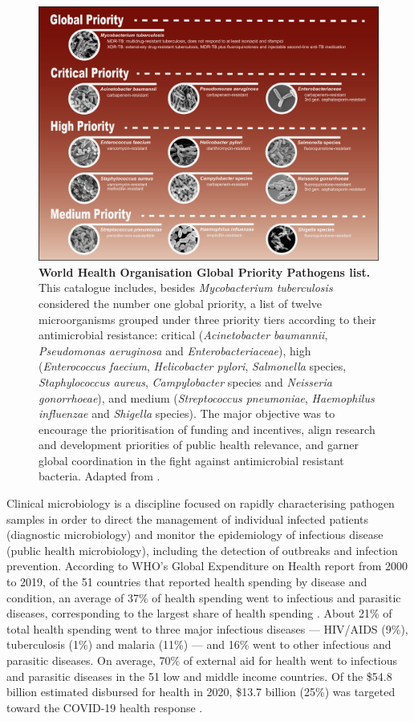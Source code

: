 \begin{figure}[h!]
\centering
\includegraphics[width=\textwidth]{figures/introduction/Figure 1.png}
\caption{\textbf{World Health Organisation Global Priority Pathogens list.} This catalogue includes, besides \textit{Mycobacterium tuberculosis} considered the number one global priority, a list of twelve microorganisms grouped under three priority tiers according to their antimicrobial resistance: critical (\textit{Acinetobacter baumannii}, \textit{Pseudomonas aeruginosa} and \textit{Enterobacteriaceae}), high (\textit{Enterococcus faecium}, \textit{Helicobacter pylori}, \textit{Salmonella} species, \textit{Staphylococcus aureus}, \textit{Campylobacter} species and \textit{Neisseria gonorrhoeae}), and medium (\textit{Streptococcus pneumoniae}, \textit{Haemophilus influenzae} and \textit{Shigella} species). The major objective was to encourage the prioritisation of funding and incentives, align research and development priorities of public health relevance, and garner global coordination in the fight against antimicrobial resistant bacteria. Adapted from \cite{world_health_organization_prioritization_2017}.}
\label{fig:figure1}
\end{figure}

Clinical microbiology is a discipline focused on rapidly characterising pathogen samples in order to direct the management of individual infected patients (diagnostic microbiology) and monitor the epidemiology of infectious disease (public health microbiology), including the detection of outbreaks and infection prevention. According to WHO's Global Expenditure on Health report from 2000 to 2019, of the 51 countries that reported health spending by disease and condition, an average of 37\% of health spending went to infectious and parasitic diseases, corresponding to the largest share of health spending \citep{world_health_organization_global_2021}. About 21\% of total health spending went to three major infectious diseases — HIV/AIDS (9\%), tuberculosis (1\%) and malaria (11\%) — and 16\% went to other infectious and parasitic diseases. On average, 70\% of external aid for health went to infectious and parasitic diseases in the 51 low and middle income countries. Of the \$54.8 billion estimated disbursed for health in 2020, \$13.7 billion (25\%) was targeted toward the COVID-19 health response \citep{micah_tracking_2021}.

